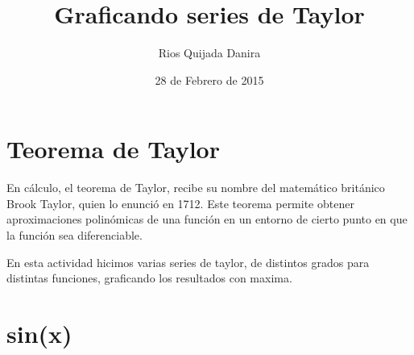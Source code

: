 \documentclass[10pt]{article}
\title{Graficando series de Taylor}
\author{Rios Quijada Danira}
\date{28 de Febrero de 2015}
\begin{document}
\maketitle
\section{Teorema de Taylor}
En cálculo, el teorema de Taylor, recibe su nombre del matemático británico Brook Taylor, quien lo enunció en 1712. Este teorema permite obtener aproximaciones polinómicas de una función en un entorno de cierto punto en que la función sea diferenciable.

En esta actividad hicimos varias series de taylor, de distintos grados para distintas funciones, graficando los resultados con maxima. 

\section{sin(x)} 
\end{document}
